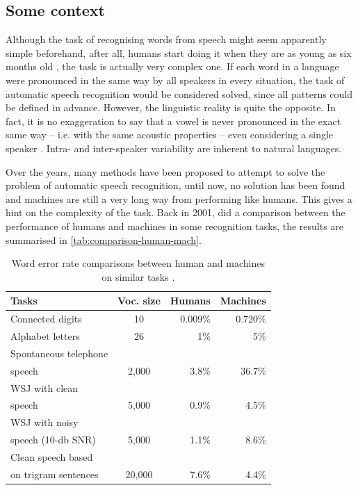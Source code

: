 \subsection{Some context}

Although the task of recognising words from speech might seem apparently simple beforehand, after all, humans start doing it when they are as young as six months old \cite{Bergelson2012}, the task is actually very complex one. If each word in a language were pronounced in the same way by all speakers in every situation, the task of automatic speech recognition would be considered solved, since all patterns could be defined in advance. However, the linguistic reality is quite the opposite. In fact, it is no exaggeration to say that a vowel is never pronounced in the exact same way -- i.e. with the same acoustic properties -- even considering a single speaker \cite{Johnson2004}. Intra- and inter-speaker variability are inherent to natural languages.

Over the years, many methods have been 
proposed to attempt to solve the problem of automatic speech recognition, until now, no solution has been found and machines are still
a very long way from performing like humans. This gives a hint on the complexity of the task. Back in 2001, \citet{Huang2001} did a comparison between the performance of humans and machines in some recognition tasks, the results are summarised in \autoref{tab:comparison-human-mach}.

\begin{table}[!ht]
  \caption[Word error rate comparisons between human and machines on similar tasks \citep{Huang2001}.]{Word error rate comparisons between human and machines on similar tasks \citep{Huang2001}.}
  \smallskip
  \centering
  \begin{tabular}{lcrr} \toprule
      \textbf{Tasks} & \textbf{Voc. size} & \textbf{Humans} & \textbf{Machines} \\ \midrule
      \small Connected digits & 10 & 0.009\% & 0.720\% \\
      \small Alphabet letters & 26 & 1\% & 5\% \\
      \small Spontaneous telephone \\ speech & 2,000 & 3.8\% & 36.7\% \\
      \small WSJ with clean \\ \small speech & 5,000 & 0.9\% & 4.5\% \\
      \small WSJ with noisy \\ \small speech (10-db SNR) & 5,000 & 1.1\% & 8.6\% \\
      \small Clean speech based \\ \small on trigram sentences & 20,000 & 7.6\% & 4.4\% \\
    \bottomrule
  \end{tabular}
  \label{tab:comparison-human-mach}
\end{table}

